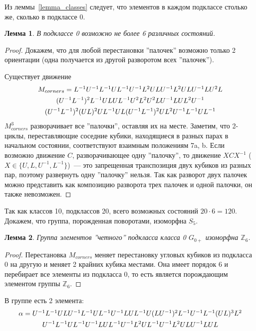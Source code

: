 \documentclass[utf8,a4paper,12pt]{article}
\newtheorem{lemma_cub}{Лемма}[section]
\begin{document}
Из леммы~\ref{lemma_classes} следует, что элементов в каждом подклассе столько же, сколько в подклассе 0.
\begin{lemma_cub}
В подклассе 0 возможно не более 6 различных состояний.
\end{lemma_cub}
\begin{proof}
Докажем, что для любой перестановки ''палочек'' возможно только 2 ориентации (одна получается из другой разворотом всех ''палочек'').

Существует движение
\begin{multline*}
$$
M_{corners}=L^{-1}U^{-1}L^{-1}UL^{-1}U^{-1}L^2ULU^{-1}L^2ULU^{-1}LU^2L \\
(U^{-1}L^{-1})^2L^{-1}ULUL^{-1}U^2L^2U^2LU^{-1}LUL^2U^{-1} \\
(U^{-1}L^{-1})^2(UL)^2UL^{-1}UL(U^{-1}L^{-1})^2UL^2U^{-1}L^{-1}UL^{-1}
$$
\end{multline*}
$M_{corners}^3$ разворачивает все ''палочки'', оставляя их на месте.
Заметим, что 2-циклы, переставляющие соседние кубики, находящиеся в разных парах в начальном состоянии, соответствуют взаимным положениям 7a, b.
Если возможно движение $C$, разворачивающее одну ''палочку'', то движение $XCX^{-1}$ ($X\in \{U,L,U^{-1},L^{-1}\}$)~--- это запрещенная транспозиция двух кубиков из разных пар, поэтому развернуть одну ''палочку'' нельзя.
Так как разворот двух палочек можно представить как композицию разворота трех палочек и одной палочки, он также невозможен.
\end{proof}
Так как классов 10, подклассов 20, всего возможных состояний $20\cdot 6=120$.
Докажем, что группа, порожденная поворотами, изоморфна $S_5$.
\begin{lemma_cub}
\label{lemma4}
Группа элементов ''четного'' подкласса класса 0 $G_{0+}$ изоморфна $\mathbb{Z}_6$.
\end{lemma_cub}
\begin{proof}
Перестановка $M_{corners}$ меняет перестановку угловых кубиков из подкласса 0 на другую и меняет 2 крайних кубика местами. Она имеет порядок 6 и перебирает все элементы из подкласса 0, то есть является порождающим элементом группы $\mathbb{Z}_6$.
\end{proof}
В группе есть 2 элемента:
\begin{multline*} %
$$
\alpha=U^{-1}L^{-1}ULU^{-1}L^{-1}UL^{-1}U^{-1}LUL^{-1}U(LU^{-1})^2L^{-1}U^{-1}L^{-1}(UL)^3L^2 \\
	U^{-1}L^{-1}UL^{-1}U^{-1}LUL^{-1}U^{-1}L^2UL^{-1}U^{-1}L^2ULU^{-1}LUL
$$
\end{multline*}
\end{document}
